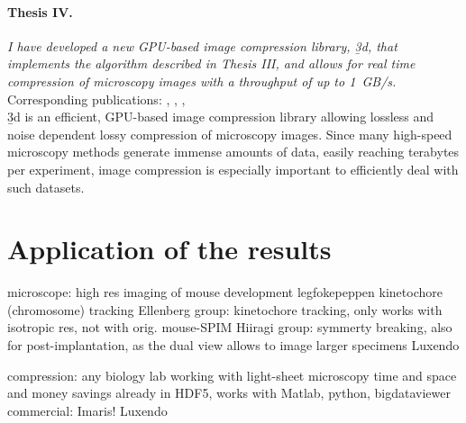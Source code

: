   \paragraph{Thesis IV.} \textit{I have  developed a new GPU-based image compression library, \b3d, that implements the algorithm described in Thesis III, and allows for real time compression of microscopy images with a throughput of up to \SI{1}{GB/s}.}\\[0.5ex]
    Corresponding publications: \cite{balazs_real-time_2017}, \cite{balazs_gpu-based_2016}, \cite{balazs_gpu-based_2016-1}, \cite{balazs_gpu-based_2017}\\[0.5ex]
    \b3d is an efficient, GPU-based image compression library allowing lossless and noise dependent lossy compression of microscopy images. Since many high-speed microscopy methods generate immense amounts of data, easily reaching terabytes per experiment, image compression is especially important to efficiently deal with such datasets.


\section{Application of the results}
microscope:
high res imaging of mouse development
legfokepeppen kinetochore (chromosome) tracking
Ellenberg group: kinetochore tracking, only works with isotropic res, not with orig. mouse-SPIM
Hiiragi group: symmerty breaking, also for post-implantation, as the dual view allows to image larger specimens
Luxendo

compression:
any biology lab working with light-sheet microscopy
time and space and money savings
already in HDF5, works with Matlab, python, bigdataviewer
commercial:
Imaris!
Luxendo